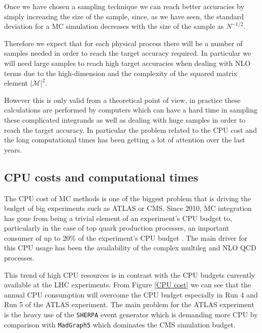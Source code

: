 \documentclass[../main/main.tex]{subfiles}
\begin{document}
Once we have chosen a sampling technique we can reach better accuracies by simply increasing the size of the sample, since, as we have seen, the 
standard deviation for a MC simulation decreases with the size of the sample as $N^{-1/2}$.

Therefore we expect that for each physical process there will be a number of samples needed in order to reach the target accuracy required. 
In particular we will need large samples to reach high target accuracies when dealing with NLO terms due to the high-dimension and the 
complexity of the squared matrix element $|\mathcal{M}|^2$.

However this is only valid from a theoretical point of view, in practice these calculations are performed by computers which can have a hard time
in sampling these complicated integrands as well as dealing with huge samples in order to reach the target accuracy.
In particular the problem related to the CPU cost and the long computational times has been getting a lot of attention over the last years.



\subsection{CPU costs and computational times}
\label{cost}
The CPU cost of MC methods is one of the biggest problem that is driving the budget of big experiments such as ATLAS or CMS.
Since 2010, MC integration has gone from being a trivial element of an experiment's CPU budget to, particularly in the case of top 
quark production processes, an important consumer of up to 20\% of the experiment's CPU budget \cite{Buckley:2019wov}. 
The main driver for this CPU usage has been the availability of the complex multileg and NLO QCD processes. 

This trend of high CPU resources  is in contrast with the CPU budgets currently available at the LHC experiments.   
From Figure \ref{CPU cost} we can see that the annual CPU consumption will overcome the CPU budget especially in Run 4 and Run 5 of the ATLAS
experiment. 
The main problem for the ATLAS experiment is the heavy use of the \texttt{SHERPA} \cite{Gleisberg:2008ta} event generator which is demanding more CPU  by comparison with
\texttt{MadGraph5} \cite{Alwall:2014hca} which dominates the CMS simulation budget. 
\end{document}
